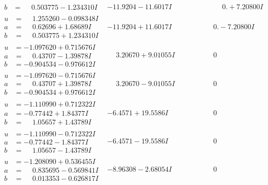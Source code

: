 \documentclass[1p]{elsarticle_modified}
\theoremstyle{definition}
\begin{document}
$$\begin{array}{c|c|c}
\begin{aligned}
b &= \phantom{-}0.503775 - 1.234310 I\end{aligned}
 & -11.9204 - 11.6017 I & \phantom{-0.000000 -}0. + 7.20800 I \\ \hline\begin{aligned}
u &= \phantom{-}1.255260 - 0.098348 I \\
a &= \phantom{-}0.62696 + 1.68689 I \\
b &= \phantom{-}0.503775 + 1.234310 I\end{aligned}
 & -11.9204 + 11.6017 I & \phantom{-0.000000 } 0. - 7.20800 I \\ \hline\begin{aligned}
u &= -1.097620 + 0.715676 I \\
a &= \phantom{-}0.43707 - 1.39878 I \\
b &= -0.904534 - 0.976612 I\end{aligned}
 & \phantom{-}3.20670 + 9.01055 I & \phantom{-0.000000 } 0 \\ \hline\begin{aligned}
u &= -1.097620 - 0.715676 I \\
a &= \phantom{-}0.43707 + 1.39878 I \\
b &= -0.904534 + 0.976612 I\end{aligned}
 & \phantom{-}3.20670 - 9.01055 I & \phantom{-0.000000 } 0 \\ \hline\begin{aligned}
u &= -1.110990 + 0.712322 I \\
a &= -0.77442 + 1.84377 I \\
b &= \phantom{-}1.05657 + 1.43789 I\end{aligned}
 & -6.4571 + 19.5586 I & \phantom{-0.000000 } 0 \\ \hline\begin{aligned}
u &= -1.110990 - 0.712322 I \\
a &= -0.77442 - 1.84377 I \\
b &= \phantom{-}1.05657 - 1.43789 I\end{aligned}
 & -6.4571 - 19.5586 I & \phantom{-0.000000 } 0 \\ \hline\begin{aligned}
u &= -1.208090 + 0.536455 I \\
a &= \phantom{-}0.835695 - 0.569841 I \\
b &= \phantom{-}0.013353 - 0.626817 I\end{aligned}
 & -8.96308 - 2.68054 I & \phantom{-0.000000 } 0 \\ \hline\begin{aligned}

\end{aligned}
\end{array}$$
\end{document}

